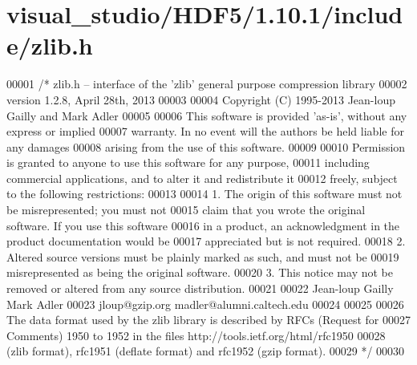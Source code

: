 \hypertarget{visual__studio_2_h_d_f5_21_810_81_2include_2zlib_8h_source}{}\section{visual\+\_\+studio/\+H\+D\+F5/1.10.1/include/zlib.h}
\label{visual__studio_2_h_d_f5_21_810_81_2include_2zlib_8h_source}

\begin{DoxyCode}
00001 \textcolor{comment}{/* zlib.h -- interface of the 'zlib' general purpose compression library}
00002 \textcolor{comment}{  version 1.2.8, April 28th, 2013}
00003 \textcolor{comment}{}
00004 \textcolor{comment}{  Copyright (C) 1995-2013 Jean-loup Gailly and Mark Adler}
00005 \textcolor{comment}{}
00006 \textcolor{comment}{  This software is provided 'as-is', without any express or implied}
00007 \textcolor{comment}{  warranty.  In no event will the authors be held liable for any damages}
00008 \textcolor{comment}{  arising from the use of this software.}
00009 \textcolor{comment}{}
00010 \textcolor{comment}{  Permission is granted to anyone to use this software for any purpose,}
00011 \textcolor{comment}{  including commercial applications, and to alter it and redistribute it}
00012 \textcolor{comment}{  freely, subject to the following restrictions:}
00013 \textcolor{comment}{}
00014 \textcolor{comment}{  1. The origin of this software must not be misrepresented; you must not}
00015 \textcolor{comment}{     claim that you wrote the original software. If you use this software}
00016 \textcolor{comment}{     in a product, an acknowledgment in the product documentation would be}
00017 \textcolor{comment}{     appreciated but is not required.}
00018 \textcolor{comment}{  2. Altered source versions must be plainly marked as such, and must not be}
00019 \textcolor{comment}{     misrepresented as being the original software.}
00020 \textcolor{comment}{  3. This notice may not be removed or altered from any source distribution.}
00021 \textcolor{comment}{}
00022 \textcolor{comment}{  Jean-loup Gailly        Mark Adler}
00023 \textcolor{comment}{  jloup@gzip.org          madler@alumni.caltech.edu}
00024 \textcolor{comment}{}
00025 \textcolor{comment}{}
00026 \textcolor{comment}{  The data format used by the zlib library is described by RFCs (Request for}
00027 \textcolor{comment}{  Comments) 1950 to 1952 in the files http://tools.ietf.org/html/rfc1950}
00028 \textcolor{comment}{  (zlib format), rfc1951 (deflate format) and rfc1952 (gzip format).}
00029 \textcolor{comment}{*/}
00030 

\end{DoxyCode}
